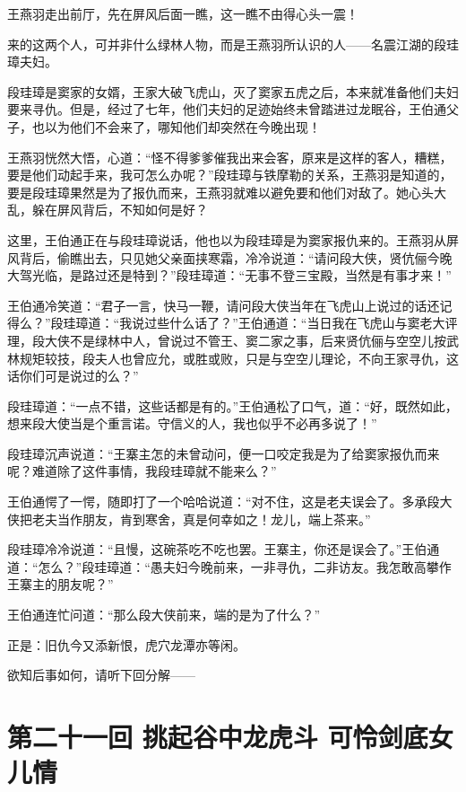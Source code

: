 \documentclass[12pt,oneside]{book}
\begin{document}
王燕羽走出前厅，先在屏风后面一瞧，这一瞧不由得心头一震！

来的这两个人，可并非什么绿林人物，而是王燕羽所认识的人------名震江湖的段珪璋夫妇。

段珪璋是窦家的女婿，王家大破飞虎山，灭了窦家五虎之后，本来就准备他们夫妇要来寻仇。但是，经过了七年，他们夫妇的足迹始终未曾踏进过龙眠谷，王伯通父子，也以为他们不会来了，哪知他们却突然在今晚出现！

王燕羽恍然大悟，心道：``怪不得爹爹催我出来会客，原来是这样的客人，糟糕，要是他们动起手来，我可怎么办呢？''段珪璋与铁摩勒的关系，王燕羽是知道的，要是段珪璋果然是为了报仇而来，王燕羽就难以避免要和他们对敌了。她心头大乱，躲在屏风背后，不知如何是好？

这里，王伯通正在与段珪璋说话，他也以为段珪璋是为窦家报仇来的。王燕羽从屏风背后，偷瞧出去，只见她父亲面挟寒霜，冷冷说道：``请问段大侠，贤伉俪今晚大驾光临，是路过还是特到？''段珪璋道：``无事不登三宝殿，当然是有事才来！''

王伯通冷笑道：``君子一言，快马一鞭，请问段大侠当年在飞虎山上说过的话还记得么？''段珪璋道：``我说过些什么话了？''王伯通道：``当日我在飞虎山与窦老大评理，段大侠不是绿林中人，曾说过不管王、窦二家之事，后来贤伉俪与空空儿按武林规矩较技，段夫人也曾应允，或胜或败，只是与空空儿理论，不向王家寻仇，这话你们可是说过的么？''

段珪璋道：``一点不错，这些话都是有的。''王伯通松了口气，道：``好，既然如此，想来段大使当是个重言诺。守信义的人，我也似乎不必再多说了！''

段珪璋沉声说道：``王寨主怎的未曾动问，便一口咬定我是为了给窦家报仇而来呢？难道除了这件事情，我段珪璋就不能来么？''

王伯通愕了一愕，随即打了一个哈哈说道：``对不住，这是老夫误会了。多承段大侠把老夫当作朋友，肯到寒舍，真是何幸如之！龙儿，端上茶来。''

段珪璋冷冷说道：``且慢，这碗茶吃不吃也罢。王寨主，你还是误会了。''王伯通道：``怎么？''段珪璋道：``愚夫妇今晚前来，一非寻仇，二非访友。我怎敢高攀作王寨主的朋友呢？''

王伯通连忙问道：``那么段大侠前来，端的是为了什么？''

正是：旧仇今又添新恨，虎穴龙潭亦等闲。

欲知后事如何，请听下回分解------

\chapter{第二十一回 挑起谷中龙虎斗
可怜剑底女儿情}\label{ux7b2cux4e8cux5341ux4e00ux56de-ux6311ux8d77ux8c37ux4e2dux9f99ux864eux6597-ux53efux601cux5251ux5e95ux5973ux513fux60c5}
\end{document}
